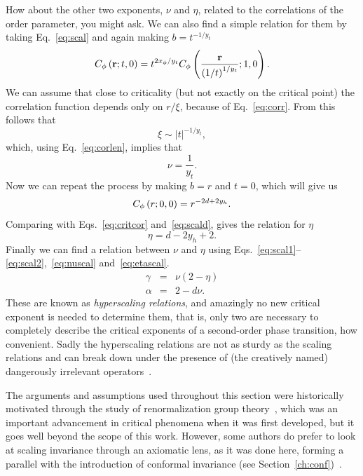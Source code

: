 How about the other two exponents, $\nu$ and $\eta$, related to the
correlations of the order parameter, you might ask. We can also find a simple
relation for them by taking Eq.~\ref{eq:scal} and again making $b=t^{-1/y_t}$
\begin{equation}
    C_{\phi}\left(\mathbf{r};t,0\right)=
    t^{2x_{\phi}/y_{t}}C_{\phi}
    \left(\frac{\mathbf{r}}{{\left(1/t\right)}^{1/y_{t}}};1,0\right).
\end{equation}
We can assume that close to criticality (but not exactly on the critical point)
the correlation function depends only on $r/\xi$, because of
Eq.~\ref{eq:corr}. From this follows that
\begin{equation}
    \xi\sim\left|t\right|^{-1/y_t},
\end{equation}
which, using Eq.~\ref{eq:corlen}, implies that
\begin{equation}
    \label{eq:nuscal}
    \nu=\frac{1}{y_t}.
\end{equation}
Now we can repeat the process by making $b=r$ and $t=0$, which will give us
\begin{equation}
    C_{\phi}\left(r;0,0\right)=r^{-2d+2y_{h}}.
\end{equation}
Comparing with Eqs.~\ref{eq:critcor} and~\ref{eq:scald}, gives the relation for
$\eta$
\begin{equation}
    \label{eq:etascal}
    \eta=d-2y_h+2.
\end{equation}
Finally we can find a relation between $\nu$ and $\eta$ using
Eqs.~\ref{eq:scal1}--\ref{eq:scal2},~\ref{eq:nuscal} and~\ref{eq:etascal}.
\begin{eqnarray}
    \label{eq:hs1}
    \gamma & = & \nu\left(2-\eta\right)\\
    \label{eq:hs2}
    \alpha & = & 2-d\nu.
\end{eqnarray}
These are known as \textit{hyperscaling relations}, and amazingly no new
critical exponent is needed to determine them, that is, only two are necessary
to completely describe the critical exponents of a second-order phase
transition, how convenient. Sadly the hyperscaling relations are not as sturdy
as the scaling relations and can break down under the presence of (the
creatively named) dangerously irrelevant operators~\cite{Nishimori2011}.

The arguments and assumptions used throughout this section were historically
motivated through the study of renormalization group
theory~\cite{Pelissetto2002}, which was an important advancement in critical
phenomena when it was first developed, but it goes well beyond the scope of
this work. However, some authors do prefer to look at scaling invariance
through an axiomatic lens, as it was done here, forming a parallel with the
introduction of conformal invariance (see
Section~\ref{ch:conf})~\cite{Henkel2013}.


